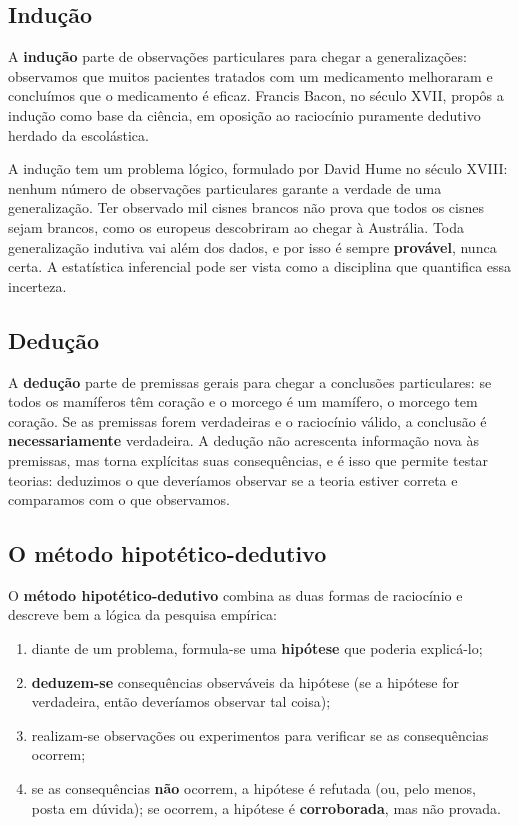 \documentclass[
]{book}
\providecommand{\tightlist}{%
  \setlength{\itemsep}{0pt}\setlength{\parskip}{0pt}}
\begin{document}
\subsection{Indução}\label{induuxe7uxe3o}

A \textbf{indução} parte de observações particulares para chegar a generalizações: observamos que muitos pacientes tratados com um medicamento melhoraram e concluímos que o medicamento é eficaz. Francis Bacon, no século XVII, propôs a indução como base da ciência, em oposição ao raciocínio puramente dedutivo herdado da escolástica.

A indução tem um problema lógico, formulado por David Hume no século XVIII: nenhum número de observações particulares garante a verdade de uma generalização. Ter observado mil cisnes brancos não prova que todos os cisnes sejam brancos, como os europeus descobriram ao chegar à Austrália. Toda generalização indutiva vai além dos dados, e por isso é sempre \textbf{provável}, nunca certa. A estatística inferencial pode ser vista como a disciplina que quantifica essa incerteza.

\subsection{Dedução}\label{deduuxe7uxe3o}

A \textbf{dedução} parte de premissas gerais para chegar a conclusões particulares: se todos os mamíferos têm coração e o morcego é um mamífero, o morcego tem coração. Se as premissas forem verdadeiras e o raciocínio válido, a conclusão é \textbf{necessariamente} verdadeira. A dedução não acrescenta informação nova às premissas, mas torna explícitas suas consequências, e é isso que permite testar teorias: deduzimos o que deveríamos observar se a teoria estiver correta e comparamos com o que observamos.

\subsection{O método hipotético-dedutivo}\label{o-muxe9todo-hipotuxe9tico-dedutivo}

O \textbf{método hipotético-dedutivo} combina as duas formas de raciocínio e descreve bem a lógica da pesquisa empírica:

\begin{enumerate}
\def\labelenumi{\arabic{enumi}.}
\tightlist
\item
  diante de um problema, formula-se uma \textbf{hipótese} que poderia explicá-lo;
\item
  \textbf{deduzem-se} consequências observáveis da hipótese (se a hipótese for verdadeira, então deveríamos observar tal coisa);
\item
  realizam-se observações ou experimentos para verificar se as consequências ocorrem;
\item
  se as consequências \textbf{não} ocorrem, a hipótese é refutada (ou, pelo menos, posta em dúvida); se ocorrem, a hipótese é \textbf{corroborada}, mas não provada.
\end{enumerate}
\end{document}
